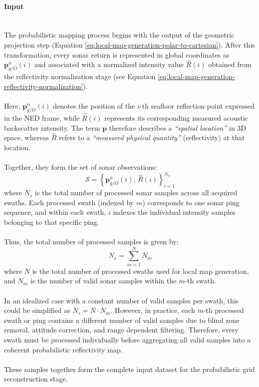 \paragraph{Input} \mbox{}\\[0.5em] \noindent
The probabilistic mapping process begins with the output of the geometric projection step (Equation \ref{eq:local-map-generation-polar-to-cartesian}). After this transformation, every sonar return is represented in global coordinates as $\mathbf{p}_{g/O}^{n}(i)$ and associated with a normalized intensity value $\hat{R}(i)$ obtained from the reflectivity normalization stage (see Equation \ref{eq:local-map-generation-reflectivity-normalization}).  
\\ \\
Here, $\mathbf{p}_{g/O}^{n}(i)$ denotes the position of the $i$-th seafloor reflection point expressed in the NED frame, while $\hat{R}(i)$ represents its corresponding measured acoustic backscatter intensity. The term $\mathbf{p}$ therefore describes a \textit{``spatial location''} in 3D space, whereas $\hat{R}$ refers to a \textit{``measured physical quantity''} (reflectivity) at that location. 
\\ \\ 
Together, they form the set of sonar observations:
$$
    \mathcal{S} = \left\{ \mathbf{p}_{g/O}^{n}(i), \, \hat{R}(i) \right\}_{i=1}^{N_s}
$$
where $N_s$ is the total number of processed sonar samples across all acquired swaths.  
Each processed swath (indexed by $m$) corresponds to one sonar ping sequence, and within each swath, $i$ indexes the individual intensity samples belonging to that specific ping.
\\ \\  
Thus, the total number of processed samples is given by:
$$
    N_s = \sum_{m=1}^{N} N_m
$$
where $N$ is the total number of processed swaths used for local map generation, and $N_m$ is the number of valid sonar samples within the $m$-th swath.  
\\ \\
In an idealized case with a constant number of valid samples per swath, this could be simplified as $N_s = N \cdot N_m$. However, in practice, each $m$-th processed swath or ping contains a different number of valid samples due to blind zone removal, attitude correction, and range dependent filtering. Therefore, every swath must be processed individually before aggregating all valid samples into a coherent probabilistic reflectivity map.
\\ \\
These samples together form the complete input dataset for the probabilistic grid reconstruction stage.

